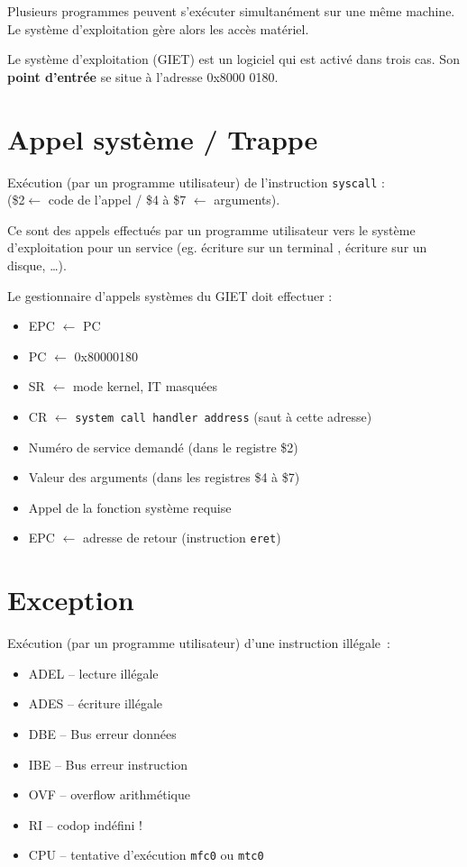 \documentclass[11pt,english,french]{scrreprt}
\theoremstyle{remark}
\theoremstyle{definition}
\begin{document}
Plusieurs programmes peuvent s'exécuter simultanément sur une même machine. Le système d'exploitation gère alors les accès matériel.

Le système d'exploitation (GIET) est un logiciel qui est activé dans trois cas. Son \textbf{point d'entrée} se situe à l'adresse 0x8000 0180.

\section{Appel système / Trappe} %

Exécution (par un programme utilisateur) de l'instruction \lstinline!syscall! :\\
(\$2$\leftarrow$ code de l'appel / \$4 à \$7 $\leftarrow$ arguments).

Ce sont des appels effectués par un programme utilisateur vers le système d'exploitation pour un service (eg. écriture sur un terminal , écriture sur un disque, \dots).

Le gestionnaire d'appels systèmes du GIET doit effectuer :
\begin{itemize}
	\item EPC $\leftarrow$ PC
	\item PC $\leftarrow$ 0x80000180
	\item SR $\leftarrow$ mode kernel, IT masquées
	\item CR $\leftarrow$ \lstinline!system call handler address! (saut à cette adresse)
	\item Numéro de service demandé (dans le registre \$2)
	\item Valeur des arguments (dans les registres \$4 à \$7)
	\item Appel de la fonction système requise
	\item EPC $\leftarrow$ adresse de retour (instruction \lstinline!eret!)
\end{itemize}

\section{Exception} %

Exécution (par un programme utilisateur) d'une instruction illégale~:\vspace{-10pt} \begin{multicols}{2}
\begin{itemize}
		\item ADEL -- lecture illégale
		\item ADES -- écriture illégale
		\item DBE -- Bus erreur données
		\item IBE -- Bus erreur instruction
		\item OVF -- overflow arithmétique
		\item RI -- codop indéfini !
		\item CPU -- tentative d'exécution \lstinline!mfc0! ou \lstinline!mtc0!
	\end{itemize}
\end{multicols}
\vspace{-10pt}
\end{document}

